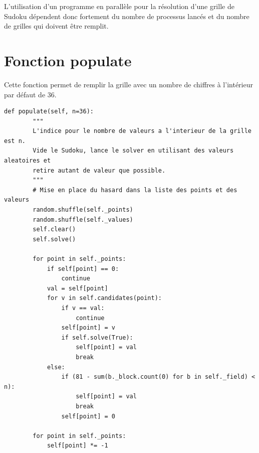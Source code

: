 \documentclass[12pt]{article}
\begin{document}
L'utilisation d'un programme en parallèle pour la résolution d'une grille de Sudoku dépendent donc fortement du nombre de processus lancés et du nombre de grilles qui doivent être remplit. 

\newpage
\appendix

\section{Fonction populate}
\label{populate}
Cette fonction permet de remplir la grille avec un nombre de chiffres à l'intérieur par défaut de 36.
\begin{lstlisting}
def populate(self, n=36):
        """
        L'indice pour le nombre de valeurs a l'interieur de la grille est n.
        Vide le Sudoku, lance le solver en utilisant des valeurs aleatoires et
        retire autant de valeur que possible.
        """
        # Mise en place du hasard dans la liste des points et des valeurs
        random.shuffle(self._points)
        random.shuffle(self._values)
        self.clear()
        self.solve()

        for point in self._points:
            if self[point] == 0:
                continue
            val = self[point]
            for v in self.candidates(point):
                if v == val:
                    continue
                self[point] = v
                if self.solve(True):
                    self[point] = val
                    break
            else:
                if (81 - sum(b._block.count(0) for b in self._field) < n):
                    self[point] = val
                    break
                self[point] = 0

        for point in self._points:
            self[point] *= -1

\end{lstlisting}
\end{document}
